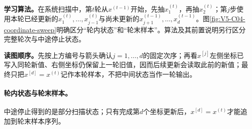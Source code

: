 \documentclass[UTF8,a4paper,11pt,openany]{ctexbook}
\begin{document}
\setcounter{page}{666}
\setcounter{chapter}{33}
\setcounter{figure}{2}
\pagestyle{headings}
\textbf{学习算法。}在系统扫描中，第$t$轮从$x^{(t-1)}$开始，先抽$x_1^{(t)}$，再抽$x_2^{(t)}$；第$j$步使用本轮已经更新的$x_1^{(t)},\ldots,x_{j-1}^{(t)}$与尚未更新的$x_{j+1}^{(t-1)},\ldots,x_d^{(t-1)}$。图\ref{fig:V5-C04-coordinate-sweep}明确区分“轮内状态”和“轮末样本”。算法及其前置说明另行区分完整轮次与中途停止状态。

\FloatBarrier
\noindent\textbf{读图顺序。}先按上方编号与箭头确认$j=1,\ldots,d$的固定次序；再看$x^{[j]}$左侧坐标已写入同轮新值、右侧坐标仍保留上一轮旧值，因而后续更新会读取此前的新值；最终只把$x^{[d]}=x^{(t)}$记作本轮样本，不把中间状态当作一轮输出。\par
\paragraph{轮内状态与轮末样本。}中途停止得到的是部分扫描状态；只有完成第$d$个坐标更新后，$x^{[d]}=x^{(t)}$才能追加到轮末样本序列。
\end{document}
